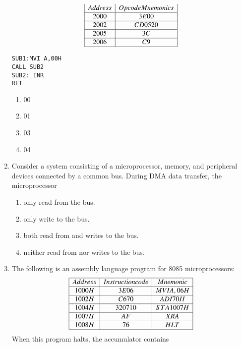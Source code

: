 \documentclass[journal,12pt,twocolumn]{IEEEtran}
\begin{document}
\begin{enumerate}
\begin{displaymath}
\begin{array}{|c|c|}
Address & Opcode Mnemonics \\\hline
2000 & 3E 00    \\\hline
2002 & CD 05 20 \\\hline
2005 & 3C       \\\hline
2006 & C9       \\\hline
\end{array}
\end{displaymath}
\begin{verbatim}
SUB1:MVI A,00H 
CALL SUB2
SUB2: INR 
RET
\end{verbatim}
    \begin{enumerate}
      \item 00
      \item 01
      \item 03
      \item 04
    \end{enumerate}
    \item Consider a system consisting of a microprocessor, memory, and peripheral devices connected by
a common bus. During DMA data transfer, the microprocessor
    \begin{enumerate}
      \item only read from the bus.
      \item only write to the bus.
      \item both read from and writes to the bus.
      \item neither read from nor writes to the bus.
    \end{enumerate}
    \item The following is an assembly language program for 8085 microprocessors:\\
\begin{displaymath}
\begin{array}{|c|c|c|} \hline

Address & Instruction code & Mnemonic   \\\hline
1000H & 3E06 & MVI A, 06H    \\\hline
1002H& C6 70 & ADI 70II      \\\hline
1004H & 32 07 10 & STA 1007H \\\hline
1007H & AF & XRA             \\\hline
1008H & 76 & HLT             \\\hline
\end{array}
\end{displaymath}
When this program halts, the accumulator contains\\
   

\end{enumerate}
\end{document}
